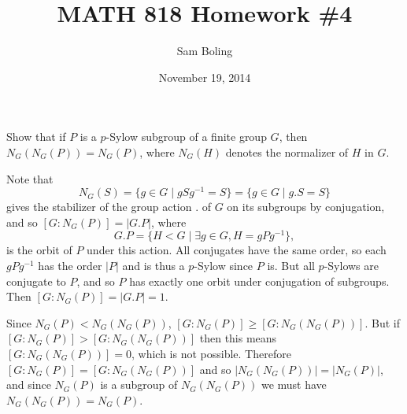 \documentclass{article}
\title{MATH 818 Homework \#4}
\date{November 19, 2014}
\author{Sam Boling}
\newcounter{Problem}
\newenvironment{Problem}{\begin{Exercise}[name={Problem},
                                          counter={Problem}]}
                        {\end{Exercise}}
\begin{document}
\begin{titlepage}
\maketitle
\end{titlepage}

\begin{Problem}
Show that if $P$ is a $p$-Sylow subgroup of a finite group $G$, then
$N_G(N_G(P)) = N_G(P)$, where $N_G(H)$ denotes the normalizer of $H$
in $G$.
\end{Problem}

\begin{Answer}
Note that
$$
  N_G(S)
= \{ g \in G \mid g S g^{-1} = S \}
= \{ g \in G \mid g . S = S \}
$$
gives the stabilizer of the group action $.$ of $G$ on its subgroups by
conjugation, and so $[G : N_G(P)] = |G . P|$, where
$$
G . P = \{ H < G \mid \exists g \in G, H = gPg^{-1} \},
$$
is the orbit of $P$ under this action.
All conjugates have the same order, so each $gPg^{-1}$ has the order
$|P|$ and is thus a $p$-Sylow since $P$ is. But all $p$-Sylows are
conjugate to $P$, and so $P$ has exactly one orbit under
conjugation of subgroups. Then $[G : N_G(P)] = |G . P| = 1$.

Since $N_G(P) < N_G(N_G(P))$,
$[G : N_G(P)] \geq [G : N_G(N_G(P))]$. But if
$[G : N_G(P)] > [G : N_G(N_G(P))]$ then this means $[G : N_G(N_G(P))] = 0$, which
is not possible. Therefore $[G : N_G(P)] = [G : N_G(N_G(P))]$ and so
$|N_G(N_G(P))| = |N_G(P)|$, and since $N_G(P)$ is a subgroup of
$N_G(N_G(P))$ we must have $N_G(N_G(P)) = N_G(P)$.
\end{Answer}

\pagebreak
\end{document}
